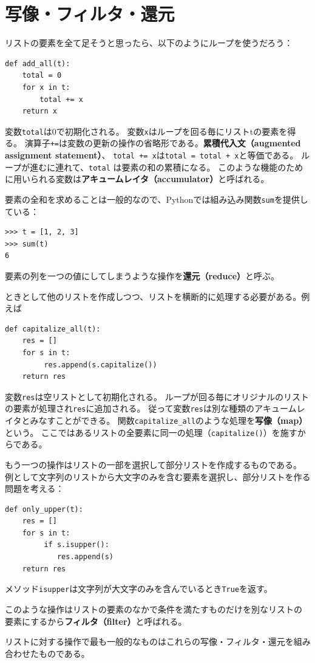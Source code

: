 \documentclass[a4j,12pt,makeidx]{jbook}
\begin{document}
\section{写像・フィルタ・還元}
リストの要素を全て足そうと思ったら、以下のようにループを使うだろう：
\begin{verbatim}
def add_all(t):
    total = 0
    for x in t:
        total += x
    return x
\end{verbatim}
変数{\tt total}は0で初期化される。
変数{\tt x}はループを回る毎にリストtの要素を得る。
演算子{\tt +=}は変数の更新の操作の省略形である。{\bf 累積代入文（augmented assignment statement）}、
{\tt total += x}は{\tt total = total + x}と等価である。
ループが進むに連れて、{\tt total} は要素の和の累積になる。
このような機能のために用いられる変数は{\bf アキュームレイタ（accumulator）}と呼ばれる。\par
要素の全和を求めることは一般的なので、Pythonでは組み込み関数{\tt sum}を提供している：
\begin{verbatim}
>>> t = [1, 2, 3]
>>> sum(t)
6
\end{verbatim} \par
要素の列を一つの値にしてしまうような操作を{\bf 還元（reduce）}と呼ぶ。\par
ときとして他のリストを作成しつつ、リストを横断的に処理する必要がある。例えば
\begin{verbatim}
def capitalize_all(t):
    res = []
    for s in t:
         res.append(s.capitalize())
    return res
\end{verbatim}
変数{\tt res}は空リストとして初期化される。
ループが回る毎にオリジナルのリストの要素が処理され{\tt res}に追加される。
従って変数{\tt res}は別な種類のアキュームレイタとみなすことができる。
関数{\tt capitalize\_all}のような処理を{\bf 写像（map）}という。
ここではあるリストの全要素に同一の処理（{\tt capitalize()}）を施すからである。\par
もう一つの操作はリストの一部を選択して部分リストを作成するものである。
例として文字列のリストから大文字のみを含む要素を選択し、部分リストを作る問題を考える：
\begin{verbatim}
def only_upper(t):
    res = []
    for s in t:
         if s.isupper():
            res.append(s)
    return res
\end{verbatim}
メソッド{\tt isupper}は文字列が大文字のみを含んでいるとき{\tt True}を返す。\par
このような操作はリストの要素のなかで条件を満たすものだけを別なリストの
要素にするから{\bf フィルタ（filter）}と呼ばれる。\par
リストに対する操作で最も一般的なものはこれらの写像・フィルタ・還元を組み合わせたものである。
%
\end{document}
